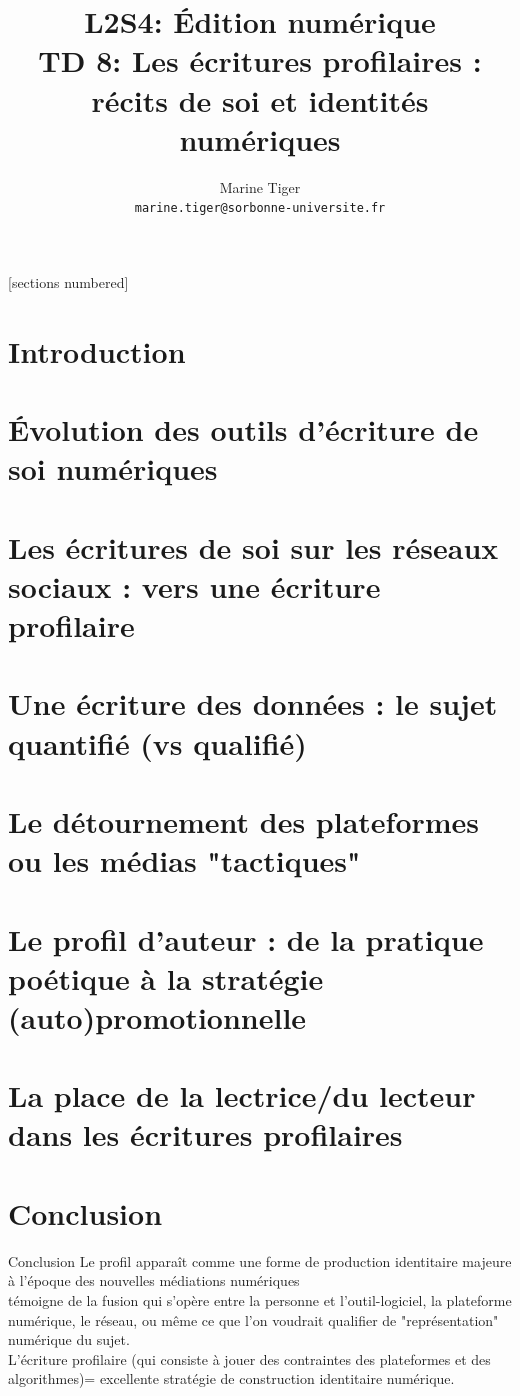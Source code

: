 \documentclass[svgnames,smaller,10pt]{beamer}
\title{L2S4: Édition numérique\\
TD 8: Les écritures profilaires : récits de soi et identités numériques
}
\date{}
\author{Marine Tiger\\   \texttt{marine.tiger@sorbonne-universite.fr}}
\institute{Littératures françaises et comparée ED19, CELLF, Sorbonne Université}
\begin{document}
\maketitle
{}[sections numbered]

\section{Introduction}


\section{Évolution des outils d'écriture de soi numériques}


\section{Les écritures de soi sur les réseaux sociaux : vers une écriture profilaire}


\section{Une écriture des données : le sujet quantifié (vs qualifié)}


\section{Le détournement des plateformes ou les médias "tactiques"}


\section{Le profil d'auteur : de la pratique poétique à la stratégie (auto)promotionnelle}


\section{La place de la lectrice/du lecteur dans les écritures profilaires}


\section{Conclusion}
\begin{frame}{Conclusion}
  Le profil apparaît comme une forme de production identitaire majeure à l'époque des nouvelles médiations numériques\\
  \textrightarrow{} témoigne de la fusion qui s'opère entre la personne et l'outil-logiciel, la plateforme numérique, le réseau, ou même ce que l'on voudrait qualifier de "représentation" numérique du sujet.\\
  \vspace{1em}
  L'écriture profilaire (qui consiste à jouer des contraintes des plateformes et des algorithmes)= excellente stratégie de construction identitaire numérique.
\end{frame}
\end{document}
